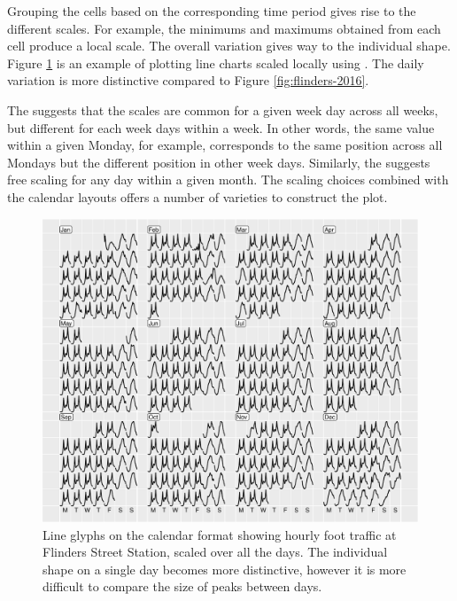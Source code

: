 \documentclass[article]{jss}
\theoremstyle{definition}
\theoremstyle{definition}
\theoremstyle{remark}
\begin{document}
Grouping the cells based on the corresponding time period gives rise to
the different scales. For example, the minimums and maximums obtained
from each cell produce a local scale. The overall variation gives way to
the individual shape. Figure \ref{fig:flinders-free} is an example of
plotting line charts scaled locally using . The
daily variation is more distinctive compared to Figure
\ref{fig:flinders-2016}.

The  suggests that the scales are common for a given
week day across all weeks, but different for each week days within a
week. In other words, the same value within a given Monday, for example,
corresponds to the same position across all Mondays but the different
position in other week days. Similarly, the  suggests
free scaling for any day within a given month. The scaling choices
combined with the calendar layouts offers a number of varieties to
construct the plot.

\begin{CodeChunk}
\begin{figure}

{\centering \includegraphics[width=\textwidth]{figure/flinders-free-1} 

}

\caption[Line glyphs on the calendar format showing
hourly foot traffic at Flinders Street Station, scaled over all the
days. The individual shape on a single day becomes more distinctive,
however it is more difficult to compare the size of peaks between days.]{Line glyphs on the calendar format showing
hourly foot traffic at Flinders Street Station, scaled over all the
days. The individual shape on a single day becomes more distinctive,
however it is more difficult to compare the size of peaks between days.}\label{fig:flinders-free}
\end{figure}
\end{CodeChunk}
\end{document}
